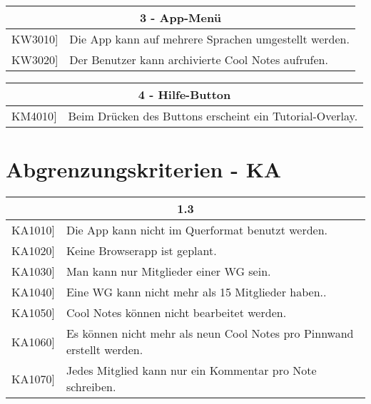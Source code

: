 \documentclass[a4paper]{scrreprt}
\begin{document}
		\vspace{5mm}
		
		\begin{table}[h!]
			\centering
			\label{my-label}
			\begin{tabular}{p{2cm}p{12cm}}
				
				\multicolumn{2}{c}{\textbf{3 - App-Menü}} \\ \hline
				\centering{[}KW3010{]} & Die App kann auf mehrere Sprachen umgestellt werden.\\
				\centering{[}KW3020{]} & Der Benutzer kann archivierte Cool Notes aufrufen.\\
				\hline
			\end{tabular}
		\end{table}
		
		\vspace{5mm}
		
		\begin{table}[h!]
			\centering
			\label{my-label}
			\begin{tabular}{p{2cm}p{12cm}}
				
				\multicolumn{2}{c}{\textbf{4 - Hilfe-Button}} \\ \hline
				\centering{[}KM4010{]} & Beim Drücken des Buttons erscheint ein Tutorial-Overlay.\\
				
				
				\hline
			\end{tabular}
		\end{table}
	
		\vspace{1cm}
		
        \section{Abgrenzungskriterien - KA}
        
        \begin{table}[h!]
        	\centering
        	\label{my-label}
        	\begin{tabular}{p{2cm}p{12cm}}
        		
        		\multicolumn{2}{c}{\textbf{1.3}} \\ \hline
        		\centering{[}KA1010{]} & Die App kann nicht im Querformat benutzt werden.\\
        		\centering{[}KA1020{]}& Keine Browserapp ist geplant.                                 \\
        		\centering{[}KA1030{]}& Man kann nur Mitglieder einer WG sein.\\ 
        		\centering{[}KA1040{]}& Eine WG kann nicht mehr als 15 Mitglieder haben..\\ 
        		\centering{[}KA1050{]}& Cool Notes können nicht bearbeitet werden.\\ 
        		\centering{[}KA1060{]}& Es können nicht mehr als neun Cool Notes pro Pinnwand erstellt werden.\\ 
        		\centering{[}KA1070{]}& Jedes Mitglied kann nur ein Kommentar pro Note schreiben.\\ 
        		\hline
        	\end{tabular}
        \end{table}
\end{document}
